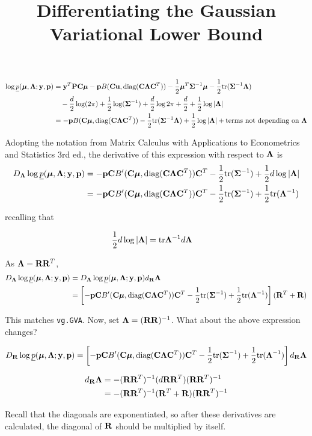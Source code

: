 \documentclass{article}[12pt]
\title{Differentiating the Gaussian Variational Lower Bound}
\begin{document}
\begin{align*}
\log \underline{p}(\vmu, \mLambda; \vy, \vp) &= \vy^T \mP \mC \vmu - \vp B(\mC \vu, \diag{(\mC \mLambda \mC^T)}) - \half \vmu^T \mSigma^{-1} \vmu - \half \tr{(\mSigma^{-1} \mLambda)} \\
&\quad - \frac{d}{2} \log(2 \pi) + \half \log(\mSigma^{-1}) + \frac{d}{2} \log{2 \pi} + \frac{d}{2} + \half \log |\mLambda| \\
&= -\vp B(\mC \vmu, \diag{(\mC \mLambda \mC^T)}) - \half \tr{(\mSigma^{-1} \mLambda)} + \half \log |\mLambda| + \text{terms not depending on $\mLambda$}
\end{align*}

\noindent Adopting the notation from Matrix Calculus with Applications to Econometrics and 
Statistics 3rd ed., the derivative of this expression with respect to $\mLambda$ is
\begin{align*}
D_\mLambda \log \underline{p}(\vmu, \mLambda; \vy, \vp) &= -\vp \mC B'(\mC \vmu, \diag{(\mC \mLambda \mC^T)}) \mC^T - \half \tr{(\mSigma^{-1})} + \half d \log |\mLambda| \\
 &=-\vp \mC B'(\mC \vmu, \diag{(\mC \mLambda \mC^T)}) \mC^T - \half \tr{(\mSigma^{-1})} + \half \tr{(\mLambda^{-1})}
\end{align*}

\noindent recalling that

\begin{align*}
\half d \log |\mLambda| &= \tr \mLambda^{-1} d \mLambda
\end{align*}

\noindent As $\mLambda = \mR \mR^T$,
\begin{align*}
D_\mLambda \log \underline{p}(\vmu, \mLambda; \vy, \vp) &= D_\mLambda \log \underline{p}(\vmu, \mLambda; \vy, \vp) d_\mR \mLambda \\
&= \left [-\vp \mC B'(\mC \vmu, \diag{(\mC \mLambda \mC^T)}) \mC^T - \half \tr{(\mSigma^{-1})} + \half \tr{(\mLambda^{-1})}\right ] (\mR^T + \mR)
\end{align*}

\noindent This matches \texttt{vg.GVA}. Now, set $\mLambda = (\mR \mR)^{-1}$. What about the
above expression changes?

\[
D_\mR \log \underline{p}(\vmu, \mLambda; \vy, \vp) = \left [ -\vp \mC B'(\mC \vmu, \diag{(\mC \mLambda \mC^T)}) \mC^T - \half \tr{(\mSigma^{-1})} + \half \tr{(\mLambda^{-1})} \right ] d_\mR \mLambda
\]

\begin{align*}
d_\mR \mLambda &= -(\mR \mR^T)^{-1} (d\mR \mR^T) (\mR \mR^T)^{-1} \\
&=-(\mR \mR^T)^{-1} (\mR^T + \mR) (\mR \mR^T)^{-1} \\
\end{align*}

\noindent Recall that the diagonals are exponentiated, so after these derivatives are
calculated, the diagonal of $\mR$ should be multiplied by itself.
\end{document}
